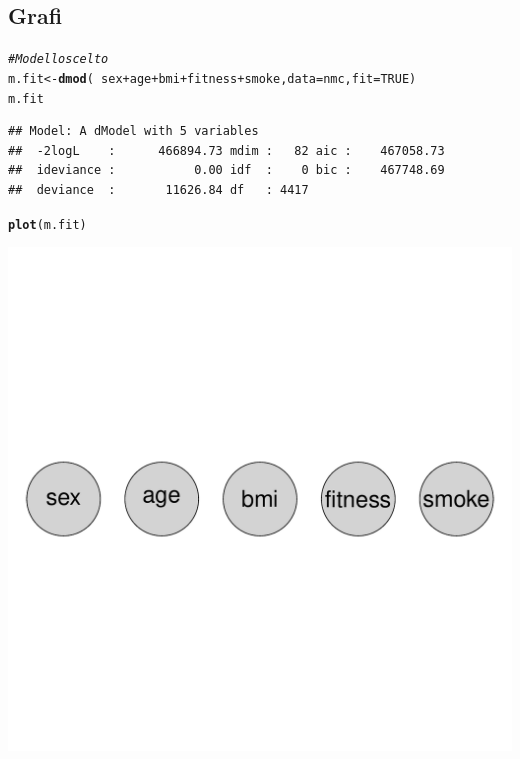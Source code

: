 \documentclass{article}\usepackage[]{graphicx}\usepackage[]{xcolor}
\makeatletter
\def\maxwidth{ %
  \ifdim\Gin@nat@width>\linewidth
    \linewidth
  \else
    \Gin@nat@width
  \fi
}
\newcommand{\hlnum}[1]{\textcolor[rgb]{0.686,0.059,0.569}{#1}}%
\newcommand{\hlcom}[1]{\textcolor[rgb]{0.678,0.584,0.686}{\textit{#1}}}%
\newcommand{\hlopt}[1]{\textcolor[rgb]{0,0,0}{#1}}%
\newcommand{\hlstd}[1]{\textcolor[rgb]{0.345,0.345,0.345}{#1}}%
\newcommand{\hlkwb}[1]{\textcolor[rgb]{0.69,0.353,0.396}{#1}}%
\newcommand{\hlkwc}[1]{\textcolor[rgb]{0.333,0.667,0.333}{#1}}%
\newcommand{\hlkwd}[1]{\textcolor[rgb]{0.737,0.353,0.396}{\textbf{#1}}}%
\newenvironment{kframe}{%
 \def\at@end@of@kframe{}%
 \ifinner\ifhmode%
  \def\at@end@of@kframe{\end{minipage}}%
  \begin{minipage}{\columnwidth}%
 \fi\fi%
 \def\FrameCommand##1{\hskip\@totalleftmargin \hskip-\fboxsep
 \colorbox{shadecolor}{##1}\hskip-\fboxsep
     \hskip-\linewidth \hskip-\@totalleftmargin \hskip\columnwidth}%
 \MakeFramed {\advance\hsize-\width
   \@totalleftmargin\z@ \linewidth\hsize
   \@setminipage}}%
 {\par\unskip\endMakeFramed%
 \at@end@of@kframe}
\newenvironment{knitrout}{}{} %
\makeatother
\begin{document}
  \subsection{Grafi}
\begin{knitrout}
\color{fgcolor}\begin{kframe}
\begin{alltt}
\hlcom{#Modello scelto}
\hlstd{m.fit} \hlkwb{<-} \hlkwd{dmod}\hlstd{(}\hlopt{~}\hlstd{sex}\hlopt{+}\hlstd{age}\hlopt{+}\hlstd{bmi}\hlopt{+}\hlstd{fitness}\hlopt{+}\hlstd{smoke,} \hlkwc{data}\hlstd{=nmc,} \hlkwc{fit}\hlstd{=}\hlnum{TRUE}\hlstd{)}
\hlstd{m.fit}
\end{alltt}
\begin{verbatim}
## Model: A dModel with 5 variables
##  -2logL    :      466894.73 mdim :   82 aic :    467058.73 
##  ideviance :           0.00 idf  :    0 bic :    467748.69 
##  deviance  :       11626.84 df   : 4417
\end{verbatim}
\begin{alltt}
\hlkwd{plot}\hlstd{(m.fit)}
\end{alltt}
\end{kframe}
\includegraphics[width=\maxwidth]{figure/Modello_scelto-1} 
\end{knitrout}
    
\end{document}
